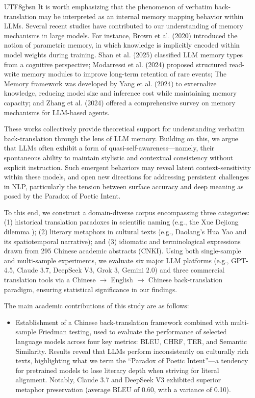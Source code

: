 \documentclass[conference]{IEEEtran}
\begin{document}
\begin{CJK*}{UTF8}{gbsn}
It is worth emphasizing that the phenomenon of verbatim back-translation may be interpreted as an internal memory mapping behavior within LLMs. Several recent studies have contributed to our understanding of memory mechanisms in large models. For instance, Brown et al. (2020) \citep{brown2020language} introduced the notion of parametric memory, in which knowledge is implicitly encoded within model weights during training. Shan et al. (2025) \citep{shan2025cognitive} classified LLM memory types from a cognitive perspective; Modarressi et al. (2024)\citep{modarressi2024memllm} proposed structured read-write memory modules to improve long-term retention of rare events;  The Memory framework was developed by Yang et al. (2024) \citep{yang2024memory3} to externalize knowledge, reducing model size and inference cost while maintaining memory capacity; and Zhang et al. (2024) \citep{zhang2024survey} offered a comprehensive survey on memory mechanisms for LLM-based agents.

These works collectively provide theoretical support for understanding verbatim back-translation through the lens of LLM memory. Building on this, we argue that LLMs often exhibit a form of quasi-self-awareness—namely, their spontaneous ability to maintain stylistic and contextual consistency without explicit instruction. Such emergent behaviors may reveal latent context-sensitivity within these models, and open new directions for addressing persistent challenges in NLP, particularly the tension between surface accuracy and deep meaning as posed by the Paradox of Poetic Intent.

To this end, we construct a domain-diverse corpus encompassing three categories: (1) historical translation paradoxes in scientific naming (e.g., the Xue Dejiong dilemma \citep{hejuan2019nomencl}); (2) literary metaphors in cultural texts (e.g., Daolang’s Hua Yao and its spatiotemporal narrative); and (3) idiomatic and terminological expressions drawn from 295 Chinese academic abstracts (CNKI). Using both single-sample and multi-sample experiments, we evaluate six major LLM platforms (e.g., GPT-4.5, Claude 3.7, DeepSeek V3, Grok 3, Gemini 2.0) and three commercial translation tools via a  Chinese $\rightarrow$ English $\rightarrow$ Chinese back-translation paradigm, ensuring statistical significance in our findings.

The main academic contributions of this study are as follows:
\begin{itemize}
\item Establishment of a Chinese back-translation framework combined with multi-sample Friedman testing, used to evaluate the performance of selected language models across four key metrics: BLEU, CHRF, TER, and Semantic Similarity. Results reveal that LLMs perform inconsistently on culturally rich texts, highlighting what we term the “Paradox of Poetic Intent”—a tendency for pretrained models to lose literary depth when striving for literal alignment. Notably, Claude 3.7 and DeepSeek V3 exhibited superior metaphor preservation (average BLEU of 0.60, with a variance of 0.10).


\end{itemize}
\end{CJK*}
\end{document}
